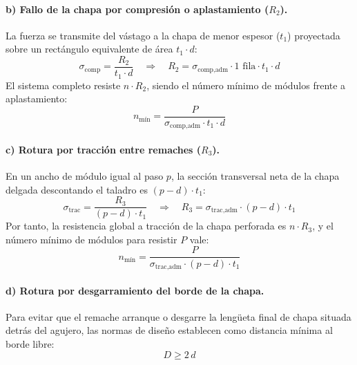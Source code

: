 \paragraph{b) Fallo de la chapa por compresión o aplastamiento ($R_2$).}
La fuerza se transmite del vástago a la chapa de menor espesor ($t_1$) proyectada sobre un rectángulo equivalente de área $t_1 \cdot d$:
\begin{equation}
    \sigma_{\text{comp}} = \frac{R_2}{t_1 \cdot d} \quad \Longrightarrow \quad R_2 = \sigma_{\text{comp,adm}} \cdot 1\text{ fila} \cdot t_1 \cdot d
    \label{eq:t8_R2_solape1}
\end{equation}
El sistema completo resiste $n \cdot R_2$, siendo el número mínimo de módulos frente a aplastamiento:
\begin{equation}
    n_{\text{mín}} = \frac{P}{\sigma_{\text{comp,adm}} \cdot t_1 \cdot d}
\end{equation}

\paragraph{c) Rotura por tracción entre remaches ($R_3$).}
En un ancho de módulo igual al paso $p$, la sección transversal neta de la chapa delgada descontando el taladro es $(p - d) \cdot t_1$:
\begin{equation}
    \sigma_{\text{trac}} = \frac{R_3}{(p - d)\cdot t_1} \quad \Longrightarrow \quad R_3 = \sigma_{\text{trac,adm}} \cdot (p - d) \cdot t_1
    \label{eq:t8_R3_general}
\end{equation}
Por tanto, la resistencia global a tracción de la chapa perforada es $n \cdot R_3$, y el número mínimo de módulos para resistir $P$ vale:
\begin{equation}
    n_{\text{mín}} = \frac{P}{\sigma_{\text{trac,adm}} \cdot (p - d) \cdot t_1}
\end{equation}

\paragraph{d) Rotura por desgarramiento del borde de la chapa.}
Para evitar que el remache arranque o desgarre la lengüeta final de chapa situada detrás del agujero, las normas de diseño establecen como distancia mínima al borde libre:
\begin{equation}
    D \ge 2\,d
    \label{eq:t8_distancia_borde}
\end{equation}

